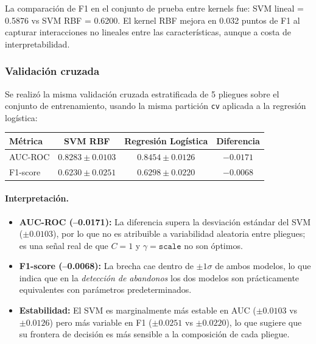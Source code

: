 \documentclass[spanish]{article}
\begin{document}
La comparación de F1 en el conjunto de prueba entre kernels fue: SVM lineal = 0.5876 vs SVM RBF = 0.6200. El kernel RBF mejora en 0.032 puntos de F1 al capturar interacciones no lineales entre las características, aunque a costa de interpretabilidad.

\subsubsection{Validación cruzada}

Se realizó la misma validación cruzada estratificada de 5 pliegues sobre el conjunto de entrenamiento, usando la misma partición \texttt{cv} aplicada a la regresión logística:

\begin{center}
\begin{tabular}{lccc}
\toprule
\textbf{Métrica} & \textbf{SVM RBF} & \textbf{Regresión Logística} & \textbf{Diferencia} \\
\midrule
AUC-ROC  & $0.8283 \pm 0.0103$ & $0.8454 \pm 0.0126$ & $-0.0171$ \\
F1-score & $0.6230 \pm 0.0251$ & $0.6298 \pm 0.0220$ & $-0.0068$ \\
\bottomrule
\end{tabular}
\end{center}

\paragraph{Interpretación.}

\begin{itemize}
    \item \textbf{AUC-ROC (–0.0171):} La diferencia supera la desviación estándar del SVM ($\pm 0.0103$), por lo que no es atribuible a variabilidad aleatoria entre pliegues; es una señal real de que $C=1$ y $\gamma=\texttt{scale}$ no son óptimos.
    \item \textbf{F1-score (–0.0068):} La brecha cae dentro de $\pm 1\sigma$ de ambos modelos, lo que indica que en la \emph{detección de abandonos} los dos modelos son prácticamente equivalentes con parámetros predeterminados.
    \item \textbf{Estabilidad:} El SVM es marginalmente más estable en AUC ($\pm 0.0103$ vs $\pm 0.0126$) pero más variable en F1 ($\pm 0.0251$ vs $\pm 0.0220$), lo que sugiere que su frontera de decisión es más sensible a la composición de cada pliegue.
\end{itemize}
\end{document}
